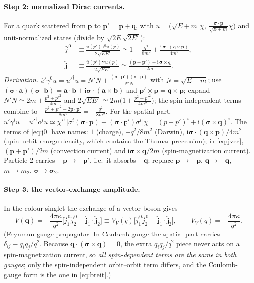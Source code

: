 \documentclass[11pt,a4paper]{article}
\numberwithin{equation}{section}
\theoremstyle{definition}
\theoremstyle{plain}
\theoremstyle{remark}
\numberwithin{algorithm}{section}
\newcommand{\vp}{\bm p}
\newcommand{\vq}{\bm q}
\newcommand{\vsig}{\bm\sigma}
\newcommand{\ii}{\mathrm{i}}
\begin{document}
\paragraph{Step 2: normalized Dirac currents.} For a quark scattered from $\vp$ to $\vp'=\vp+\vq$, with $u=\big(\sqrt{E+m}\,\chi,\ \frac{\vsig\cdot\vp}{\sqrt{E+m}}\chi\big)$ and unit-normalized states (divide by $\sqrt{2E}\sqrt{2E'}$):
\begin{align}
\hat j^{\,0}&\equiv\frac{\bar u(p')\gamma^0u(p)}{2\sqrt{EE'}}\simeq1-\frac{q^2}{8m^2}+\frac{\ii\,\vsig\cdot(\vq\times\vp)}{4m^2},\label{eq:j0}\\
\hat{\bm j}&\equiv\frac{\bar u(p')\bm\gamma u(p)}{2\sqrt{EE'}}\simeq\frac{(\vp+\vp')+\ii\,\vsig\times\vq}{2m}.\label{eq:jvec}
\end{align}
\emph{Derivation.} $\bar u'\gamma^0u=u'^\dagger u=N'N+\frac{(\vsig\cdot\vp')(\vsig\cdot\vp)}{N'N}$ with $N=\sqrt{E+m}$; use $(\vsig\cdot\bm a)(\vsig\cdot\bm b)=\bm a\cdot\bm b+\ii\vsig\cdot(\bm a\times\bm b)$ and $\vp'\times\vp=\vq\times\vp$; expand $N'N\simeq2m+\frac{p^2+p'^2}{4m}$ and $2\sqrt{EE'}\simeq2m\big(1+\frac{p^2+p'^2}{4m^2}\big)$; the spin-independent terms combine to $-\frac{p^2+p'^2-2\vp\cdot\vp'}{8m^2}=-\frac{q^2}{8m^2}$. For the spatial part, $\bar u'\gamma^iu=u'^\dagger\alpha^iu\simeq\chi'^\dagger\big[\sigma^i(\vsig\cdot\vp)+(\vsig\cdot\vp')\sigma^i\big]\chi=(p+p')^i+\ii(\vsig\times\vq)^i$.
The terms of \eqref{eq:j0} have names: $1$ (charge), $-q^2/8m^2$ (Darwin), $\ii\vsig\cdot(\vq\times\vp)/4m^2$ (spin--orbit charge density, which contains the Thomas precession); in \eqref{eq:jvec}, $(\vp+\vp')/2m$ (convection current) and $\ii\vsig\times\vq/2m$ (spin-magnetization current).
Particle 2 carries $-\vp\to-\vp'$, i.e.\ it absorbs $-\vq$: replace $\vp\to-\vp$, $\vq\to-\vq$, $m\to m_2$, $\vsig\to\vsig_2$.

\paragraph{Step 3: the vector-exchange amplitude.} In the colour singlet the exchange of a vector boson gives
\begin{equation}
V(\vq)=-\frac{4\pi\kappa}{q^2}\Big[\hat j_1^{\,0}\hat j_2^{\,0}-\hat{\bm j}_1\cdot\hat{\bm j}_2\Big]\equiv V_V(q)\Big[\hat j_1^{\,0}\hat j_2^{\,0}-\hat{\bm j}_1\cdot\hat{\bm j}_2\Big],\qquad V_V(q)=-\frac{4\pi\kappa}{q^2}.
\end{equation}
(Feynman-gauge propagator. In Coulomb gauge the spatial part carries $\delta_{ij}-q_iq_j/q^2$. Because $\vq\cdot(\vsig\times\vq)=0$, the extra $q_iq_j/q^2$ piece never acts on a spin-magnetization current, so \emph{all spin-dependent terms are the same in both gauges}; only the spin-independent orbit--orbit term differs, and the Coulomb-gauge form is the one in \eqref{eq:breit}.)
\end{document}

